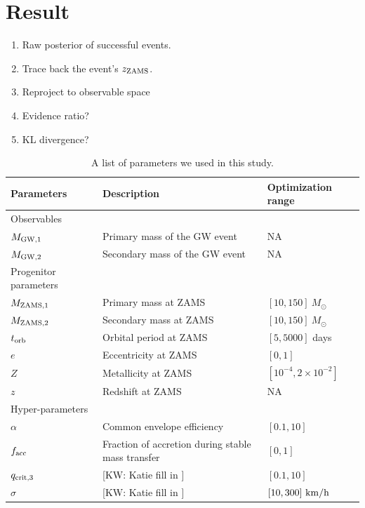\documentclass[twocolumn]{aastex631}
\newcommand{\kw}[1]{{\color{rb4}[KW: #1 ]}}
\begin{document}
\section{Result}
\label{sec:result}

\begin{enumerate}
\item Raw posterior of successful events.
\item Trace back the event's $z_{\rm ZAMS}$.
\item Reproject to observable space
\item Evidence ratio?
\item KL divergence?
\end{enumerate}

\begin{table}[hbt!]
    \begin{center}
    \begin{tabular}{ l l l }
    \hline
    \hline
    Parameters &  Description & Optimization range\\
    \hline
    \hline
    Observables &\ &\  \\
    \hline
    \hline
    $M_{\rm GW,1}$ & Primary mass of the GW event & NA \\
    $M_{\rm GW,2}$ & Secondary mass of the GW event  & NA\\
    \hline
    \hline
    Progenitor parameters &\ &\  \\
    \hline
    \hline
    $M_{\rm ZAMS,1}$ & Primary mass at ZAMS & $[10,150]\ M_{\odot}$\\
    $M_{\rm ZAMS,2}$ & Secondary mass at ZAMS & $[10,150]\ M_{\odot}$\\
    $t_{\rm orb}$ & Orbital period at ZAMS & $[5,5000]$ days\\
    $e$ & Eccentricity at ZAMS & $[0,1]$\\
    $Z$ & Metallicity at ZAMS & $[10^{-4},2\times10^{-2}]$\\
    $z$ & Redshift at ZAMS & NA\\
    \hline
    \hline
    Hyper-parameters &\ &\ \\
    \hline
    \hline
    
    $\alpha$ & Common envelope efficiency & $[0.1,10]$\\
    $f_{\rm acc}$ & Fraction of accretion during stable mass transfer & $[0,1]$\\
    $q_{\rm crit,3}$ & \kw{Katie fill in} & $[0.1,10]$\\
    $\sigma$ & \kw{Katie fill in}& $[10,300]\ {\rm km/h}$\\


    \hline
    \hline
    \end{tabular}
    \caption{A list of parameters we used in this study.}
    \label{tab:parameters}
    \end{center}
\end{table}
    
\end{document}

